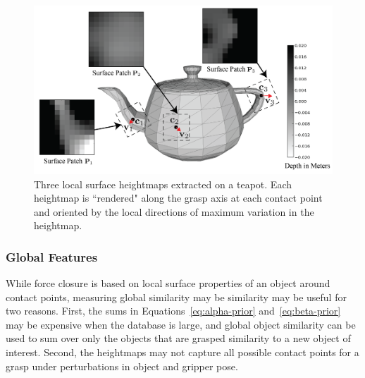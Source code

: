 \begin{figure}[t!]
\centering
\includegraphics[scale=0.35]{figures/illustrations/local_feature_model.png}
\caption{Three local surface heightmaps extracted on a teapot. Each heightmap is ``rendered" along the grasp axis at each contact point and oriented by the local directions of maximum variation in the heightmap.  }
\vspace*{-15pt}
\end{figure}

\subsubsection{Global Features}
While force closure is based on local surface properties of an object around contact points, measuring global similarity may be similarity may be useful for two reasons.
First, the sums in Equations~\ref{eq:alpha-prior} and~\ref{eq:beta-prior} may be expensive when the database is large, and global object similarity can be used to sum over only the objects that are grasped similarity to a new object of interest.
Second, the heightmaps may not capture all possible contact points for a grasp under perturbations in object and gripper pose.

